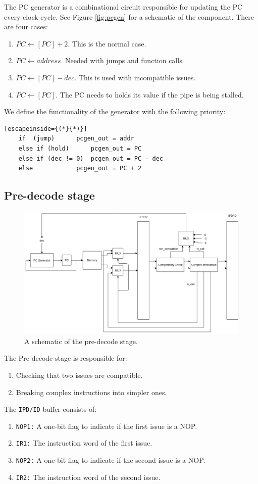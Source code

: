 \documentclass[12pt]{article}
\begin{document}
The PC generator is a combinational circuit responsible
for updating the PC every clock-cycle. See Figure \ref{fig:pcgen} for a schematic of the component.
There are four cases:
\begin{enumerate}
\item $PC \leftarrow [PC] + 2$. This is the normal case.
\item $PC \leftarrow address$. Needed with jumps and function calls.
\item $PC \leftarrow [PC] - dec$. This is used with incompatible issues.
\item $PC \leftarrow [PC]$. The PC needs to holds its value if the pipe is being stalled.
\end{enumerate}
We define the functionality of the generator with the following priority:
\begin{lstlisting}[escapeinside={(*}{*)}]
	if	(jump)		pcgen_out = addr
	else if	(hold)		pcgen_out = PC
	else if	(dec != 0)	pcgen_out = PC - dec
	else			pcgen_out = PC + 2
\end{lstlisting}

\subsection{Pre-decode stage}
\begin{figure}
	\centering
	\includegraphics[width=\linewidth]{figures/predecode.png}
	\caption{A schematic of the pre-decode stage.}
	\label{fig:predecode}
\end{figure}

 The Pre-decode stage is responsible for:
 \begin{enumerate}
	\item Checking that two issues are compatible.
	\item Breaking complex instructions into simpler ones.
 \end{enumerate}
 The \texttt{IPD/ID} buffer consists of: 
 \begin{enumerate}
	\item \texttt{NOP1:} A one-bit flag to indicate if the first issue is a NOP.
	\item \texttt{IR1:} The instruction word of the first issue.
	\item \texttt{NOP2:} A one-bit flag to indicate if the second issue is a NOP.
	\item \texttt{IR2:} The instruction word of the second issue.
\end{enumerate}
\end{document}
